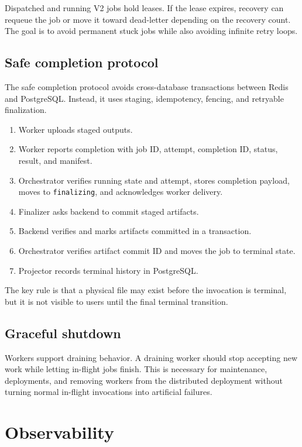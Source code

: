 \documentclass[12pt,a4paper]{report}
\newcommand{\state}[1]{\texttt{#1}}
\begin{document}
Dispatched and running V2 jobs hold leases. If the lease expires, recovery can
requeue the job or move it toward dead-letter depending on the recovery count.
The goal is to avoid permanent stuck jobs while also avoiding infinite retry
loops.

\section{Safe completion protocol}

The safe completion protocol avoids cross-database transactions between Redis
and PostgreSQL. Instead, it uses staging, idempotency, fencing, and retryable
finalization.

\begin{enumerate}[leftmargin=1.2cm]
  \item Worker uploads staged outputs.
  \item Worker reports completion with job ID, attempt, completion ID, status, result, and manifest.
  \item Orchestrator verifies running state and attempt, stores completion payload, moves to \state{finalizing}, and acknowledges worker delivery.
  \item Finalizer asks backend to commit staged artifacts.
  \item Backend verifies and marks artifacts committed in a transaction.
  \item Orchestrator verifies artifact commit ID and moves the job to terminal state.
  \item Projector records terminal history in PostgreSQL.
\end{enumerate}

The key rule is that a physical file may exist before the invocation is
terminal, but it is not visible to users until the final terminal transition.

\section{Graceful shutdown}

Workers support draining behavior. A draining worker should stop accepting new
work while letting in-flight jobs finish. This is necessary for maintenance,
deployments, and removing workers from the distributed deployment without
turning normal in-flight invocations into artificial failures.

\clearpage

\chapter{Observability}
\end{document}
